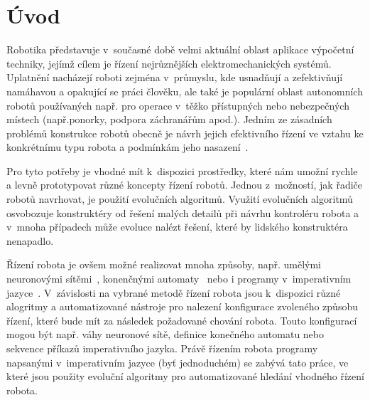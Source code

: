 \chapter{Úvod}





Robotika představuje v~současné době velmi aktuální oblast aplikace výpočetní techniky, jejímž cílem je řízení nejrůznějších
elektromechanických systémů.
Uplatnění nacházejí roboti zejména v~průmyslu, kde usnadňují a zefektivňují namáhavou a
opakující se práci člověku, ale také je populární oblast autonomních robotů používaných např. pro operace v~těžko přístupných
nebo nebezpečných místech (např.ponorky, podpora záchranářům apod.).
Jedním ze zásadních problémů konstrukce robotů obecně je návrh jejich efektivního řízení ve vztahu ke konkrétnímu typu robota a podmínkám jeho nasazení~\cite{Bongard2013}.

Pro tyto potřeby je vhodné mít k~dispozici prostředky, které nám umožní rychle a levně prototypovat různé koncepty řízení
robotů.
Jednou z~možností, jak řadiče robotů navrhovat, je použití evolučních algoritmů.
Využití evolučních algoritmů osvobozuje konstruktéry od řešení malých detailů při návrhu kontroléru robota a v~mnoha případech může evoluce nalézt řešení, které by lidského konstruktéra nenapadlo.

Řízení robota je ovšem možné realizovat mnoha způsoby, např. umělými neuronovými sítěmi~\cite{Reil2002}, konenčnými automaty~\cite{Hodgins1996} nebo i programy v~imperativním jazyce~\cite{Wolff2007}.
V~závislosti na vybrané metodě řízení robota jsou k~dispozici různé alogritmy a automatizované nástroje pro nalezení konfigurace zvoleného způsobu řízení, které bude mít za následek požadované chování robota.
Touto konfigurací mogou být např. váhy neuronové sítě, definice konečného automatu nebo sekvence příkazů imperativního jazyka.
Právě řízením robota programy napsanými v~imperativním jazyce (byť jednoduchém) se zabývá tato práce, ve které jsou použity evoluční algoritmy pro automatizované hledání vhodného řízení robota.

